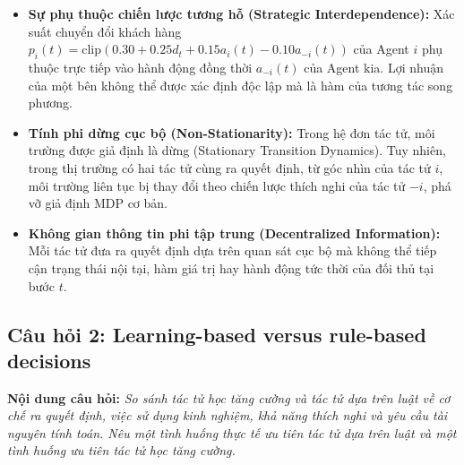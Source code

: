 \documentclass[12pt,a4paper]{article}
\begin{document}
\begin{enumerate}
\begin{itemize}
        \item \textbf{Sự phụ thuộc chiến lược tương hỗ (Strategic Interdependence):} Xác suất chuyển đổi khách hàng $p_i(t) = \text{clip}(0.30 + 0.25 d_t + 0.15 a_i(t) - 0.10 a_{-i}(t))$ của Agent $i$ phụ thuộc trực tiếp vào hành động đồng thời $a_{-i}(t)$ của Agent kia. Lợi nhuận của một bên không thể được xác định độc lập mà là hàm của tương tác song phương.
        \item \textbf{Tính phi dừng cục bộ (Non-Stationarity):} Trong hệ đơn tác tử, môi trường được giả định là dừng (Stationary Transition Dynamics). Tuy nhiên, trong thị trường có hai tác tử cùng ra quyết định, từ góc nhìn của tác tử $i$, môi trường liên tục bị thay đổi theo chiến lược thích nghi của tác tử $-i$, phá vỡ giả định MDP cơ bản.
        \item \textbf{Không gian thông tin phi tập trung (Decentralized Information):} Mỗi tác tử đưa ra quyết định dựa trên quan sát cục bộ mà không thể tiếp cận trạng thái nội tại, hàm giá trị hay hành động tức thời của đối thủ tại bước $t$.
    \end{itemize}
\end{enumerate}

\subsection{Câu hỏi 2: Learning-based versus rule-based decisions}
\textbf{Nội dung câu hỏi:} \textit{So sánh tác tử học tăng cường và tác tử dựa trên luật về cơ chế ra quyết định, việc sử dụng kinh nghiệm, khả năng thích nghi và yêu cầu tài nguyên tính toán. Nêu một tình huống thực tế ưu tiên tác tử dựa trên luật và một tình huống ưu tiên tác tử học tăng cường.}
\end{document}
